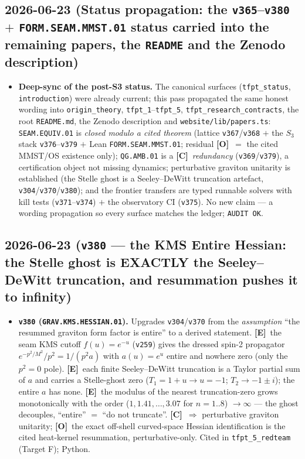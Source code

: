 \documentclass[11pt]{article}
\providecommand{\mE}{\textbf{[E]}}\providecommand{\mC}{\textbf{[C]}}
\providecommand{\mO}{\textbf{[O]}}\providecommand{\mX}{\textbf{[X]}}
\providecommand{\vref}[1]{\texttt{#1}}
\begin{document}
\subsection*{2026-06-23 (Status propagation: the \texttt{v365}--\texttt{v380} $+$ \texttt{FORM.SEAM.MMST.01} status carried into the remaining papers, the \texttt{README} and the Zenodo description)}
\begin{itemize}
\item \textbf{Deep-sync of the post-S3 status.} The canonical surfaces (\texttt{tfpt\_status}, \texttt{introduction})
were already current; this pass propagated the same honest wording into \texttt{origin\_theory},
\texttt{tfpt\_1}--\texttt{tfpt\_5}, \texttt{tfpt\_research\_contracts}, the root \texttt{README.md}, the Zenodo
description and \texttt{website/lib/papers.ts}: \texttt{SEAM.EQUIV.01} is \emph{closed modulo a cited theorem}
(lattice \vref{v367}/\vref{v368} $+$ the $S_3$ stack \vref{v376}--\vref{v379} $+$ Lean \texttt{FORM.SEAM.MMST.01};
residual \mO\ $=$ the cited MMST/OS existence only); \texttt{QG.AMB.01} is a \mC\ \emph{redundancy} (\vref{v369}/\vref{v379}),
a certification object not missing dynamics; perturbative graviton unitarity is established (the Stelle ghost is a
Seeley--DeWitt truncation artefact, \vref{v304}/\vref{v370}/\vref{v380}); and the frontier transfers are typed runnable
solvers with kill tests (\vref{v371}--\vref{v374}) $+$ the observatory CI (\vref{v375}). No new claim --- a wording
propagation so every surface matches the ledger; \texttt{AUDIT OK}.
\end{itemize}

\subsection*{2026-06-23 (\texttt{v380} --- the KMS Entire Hessian: the Stelle ghost is EXACTLY the Seeley--DeWitt truncation, and resummation pushes it to infinity)}
\begin{itemize}
\item \textbf{\texttt{v380} (\texttt{GRAV.KMS.HESSIAN.01}).} Upgrades \vref{v304}/\vref{v370} from the
\emph{assumption} ``the resummed graviton form factor is entire'' to a derived statement. \mE\ the seam KMS
cutoff $f(u){=}e^{-u}$ (\vref{v259}) gives the dressed spin-2 propagator $e^{-p^2/M^2}/p^2 = 1/(p^2 a)$ with
$a(u){=}e^u$ entire and nowhere zero (only the $p^2{=}0$ pole). \mE\ each finite Seeley--DeWitt truncation is a
Taylor partial sum of $a$ and carries a Stelle-ghost zero ($T_1{=}1{+}u\to u{=}-1$; $T_2\to-1{\pm}i$); the
entire $a$ has none. \mE\ the modulus of the nearest truncation-zero grows monotonically with the order
($1,1.41,\dots,3.07$ for $n{=}1..8$) $\to\infty$ --- the ghost decouples, ``entire'' $=$ ``do not truncate''.
\mC\ $\Rightarrow$ perturbative graviton unitarity; \mO\ the exact off-shell curved-space Hessian
identification is the cited heat-kernel resummation, perturbative-only. Cited in \texttt{tfpt\_5\_redteam}
(Target F); Python.
\end{itemize}
\end{document}
